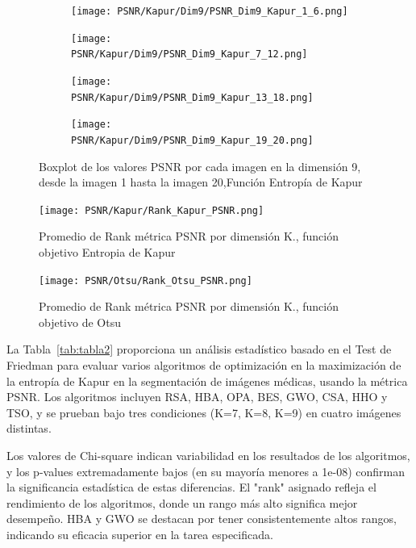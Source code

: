 \documentclass[conference]{IEEEtran}
\begin{document}
\begin{figure}[htbp]
	\centering
	\begin{subfigure}{0.4\textwidth}
		\texttt{[image: PSNR/Kapur/Dim9/PSNR\_Dim9\_Kapur\_1\_6.png]}
	\end{subfigure}
	
	\begin{subfigure}{0.4\textwidth}
		\texttt{[image: PSNR/Kapur/Dim9/PSNR\_Dim9\_Kapur\_7\_12.png]}
	\end{subfigure}
	\begin{subfigure}{0.4\textwidth}
		\texttt{[image: PSNR/Kapur/Dim9/PSNR\_Dim9\_Kapur\_13\_18.png]}
	\end{subfigure}   
	\begin{subfigure}{0.4\textwidth}
		\texttt{[image: PSNR/Kapur/Dim9/PSNR\_Dim9\_Kapur\_19\_20.png]}
		\vspace{-120pt} %
	\end{subfigure}
	\caption{Boxplot de los valores PSNR por cada imagen en la dimensión 9, desde la imagen 1 hasta la imagen 20,Función Entropía de Kapur}
	\label{fig:imagenes}    
\end{figure}



\begin{figure}[htbp]
	\centering
	\texttt{[image: PSNR/Kapur/Rank\_Kapur\_PSNR.png]}
	\caption{Promedio de Rank métrica PSNR por dimensión K., función objetivo Entropia de Kapur}
	\label{fig:fig511}
\end{figure}

\begin{figure}[htbp]
	\centering
	\texttt{[image: PSNR/Otsu/Rank\_Otsu\_PSNR.png]}
	\caption{Promedio de Rank métrica PSNR por dimensión K., función objetivo de Otsu}
\end{figure}



\noindent La Tabla~\ref{tab:tabla2} proporciona un análisis estadístico basado en el Test de Friedman para evaluar varios algoritmos de optimización en la maximización de la entropía de Kapur en la segmentación de imágenes médicas, usando la métrica PSNR. Los algoritmos incluyen RSA, HBA, OPA, BES, GWO, CSA, HHO y TSO, y se prueban bajo tres condiciones (K=7, K=8, K=9) en cuatro imágenes distintas.

\noindent Los valores de Chi-square indican variabilidad en los resultados de los algoritmos, y los p-values extremadamente bajos (en su mayoría menores a 1e-08) confirman la significancia estadística de estas diferencias. El "rank" asignado refleja el rendimiento de los algoritmos, donde un rango más alto significa mejor desempeño. HBA y GWO se destacan por tener consistentemente altos rangos, indicando su eficacia superior en la tarea especificada.
\end{document}
